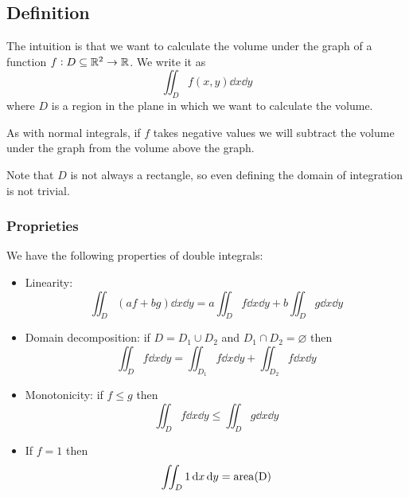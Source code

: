 \documentclass[12pt]{extarticle}
\begin{document}
\subsection{Definition}

The intuition is that we want to calculate the volume under the graph of a function $f: D \subseteq \mathbb{R}^2 \to \mathbb{R}$.
We write it as
\begin{equation}
    \iint_D f(x, y) \dd{x} \dd{y}
\end{equation}
where $D$ is a region in the plane in which we want to calculate the volume.

As with normal integrals, if $f$ takes negative values we will subtract the volume under the graph from the volume above the graph.

Note that $D$ is not always a rectangle, so even defining the domain of integration is not trivial.

\subsubsection{Proprieties}

We have the following properties of double integrals:

\begin{itemize}
    \item Linearity:
          \begin{equation}
              \iint_D (af + bg) \dd{x} \dd{y} = a \iint_D f \dd{x} \dd{y} + b \iint_D g \dd{x} \dd{y}
          \end{equation}
    \item Domain decomposition: if $D = D_1 \cup D_2$ and $D_1 \cap D_2 = \varnothing$ then
          \begin{equation}
              \iint_D f \dd{x} \dd{y} = \iint_{D_1} f \dd{x} \dd{y} + \iint_{D_2} f \dd{x} \dd{y}
          \end{equation}
    \item Monotonicity: if $f \leq g$ then
          \begin{equation}
              \iint_D f \dd{x} \dd{y} \leq \iint_D g \dd{x} \dd{y}
          \end{equation}
    \item If $f = 1$ then
          \begin{equation}
              \iint_D 1 \dd{x} \dd{y} = \operatorfont{area}(D)
          \end{equation}
\end{itemize}
\end{document}
